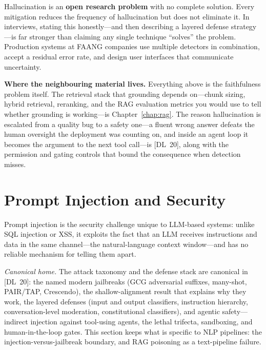 \begin{warningbox}
Hallucination is an \textbf{open research problem} with no complete solution.
Every mitigation reduces the frequency of hallucination but does not eliminate
it.  In interviews, stating this honestly---and then describing a layered
defense strategy---is far stronger than claiming any single technique ``solves''
the problem.  Production systems at FAANG companies use multiple detectors in
combination, accept a residual error rate, and design user interfaces that
communicate uncertainty.
\end{warningbox}

\textbf{Where the neighbouring material lives.}  Everything above is the
faithfulness problem itself.  The retrieval stack that grounding depends
on---chunk sizing, hybrid retrieval, reranking, and the RAG evaluation metrics
you would use to tell whether grounding is working---is
Chapter~\ref{chap:rag}.  The reason hallucination is escalated from a quality
bug to a safety one---a fluent wrong answer defeats the human oversight the
deployment was counting on, and inside an agent loop it becomes the argument to
the next tool call---is [DL~20], along with the permission and gating controls
that bound the consequence when detection misses.

\section{Prompt Injection and Security}
\label{sec:prompt_injection}

Prompt injection is the security challenge unique to LLM-based systems: unlike
SQL injection or XSS, it exploits the fact that an LLM receives instructions
and data in the same channel---the natural-language context window---and has
no reliable mechanism for telling them apart.

\emph{Canonical home.}  The attack taxonomy and the defense stack are
canonical in [DL~20]: the named modern jailbreaks (GCG adversarial suffixes,
many-shot, PAIR/TAP, Crescendo), the shallow-alignment result that explains
why they work, the layered defenses (input and output classifiers,
instruction hierarchy, conversation-level moderation, constitutional
classifiers), and agentic safety---indirect injection against tool-using
agents, the lethal trifecta, sandboxing, and human-in-the-loop gates.  This
section keeps what is specific to NLP pipelines: the
injection-versus-jailbreak boundary, and RAG poisoning as a text-pipeline
failure.

